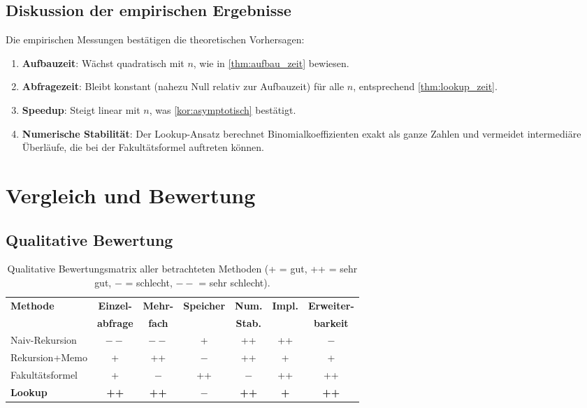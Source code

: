 ﻿\documentclass[12pt, a4paper]{article}
\theoremstyle{plain}
\theoremstyle{definition}
\theoremstyle{remark}
\begin{document}
\subsection{Diskussion der empirischen Ergebnisse}

Die empirischen Messungen bestätigen die theoretischen Vorhersagen:
\begin{enumerate}
  \item \textbf{Aufbauzeit}: Wächst quadratisch mit $n$, wie in
        \cref{thm:aufbau_zeit} bewiesen.
  \item \textbf{Abfragezeit}: Bleibt konstant (nahezu Null relativ zur
        Aufbauzeit) für alle $n$, entsprechend \cref{thm:lookup_zeit}.
  \item \textbf{Speedup}: Steigt linear mit $n$, was \cref{kor:asymptotisch}
        bestätigt.
  \item \textbf{Numerische Stabilität}: Der Lookup-Ansatz berechnet
        Binomialkoeffizienten exakt als ganze Zahlen und vermeidet
        intermediäre Überläufe, die bei der Fakultätsformel auftreten
        können.
\end{enumerate}


\section{Vergleich und Bewertung}
\label{sec:vergleich}

\subsection{Qualitative Bewertung}

\begin{table}[H]
  \centering
  \caption{Qualitative Bewertungsmatrix aller betrachteten Methoden
    (+ = gut, ++ = sehr gut, $-$ = schlecht, $--$ = sehr schlecht).}
  \label{tab:bewertung}
  \begin{tabular}{lcccccc}
    \toprule
    \textbf{Methode} & \textbf{Einzel-} & \textbf{Mehr-} & \textbf{Speicher} &
    \textbf{Num.} & \textbf{Impl.} & \textbf{Erweiter-} \\
    & \textbf{abfrage} & \textbf{fach} & & \textbf{Stab.} & \textbf{} & \textbf{barkeit} \\
    \midrule
    Naiv-Rekursion & $--$ & $--$ & + & ++ & ++ & $-$ \\
    Rekursion+Memo & + & ++ & $-$ & ++ & + & + \\
    Fakultätsformel & + & $-$ & ++ & $-$ & ++ & ++ \\
    \textbf{Lookup} & \textbf{++} & \textbf{++} & \textbf{$-$} &
    \textbf{++} & \textbf{+} & \textbf{++} \\
    \bottomrule
  \end{tabular}
\end{table}
\end{document}
